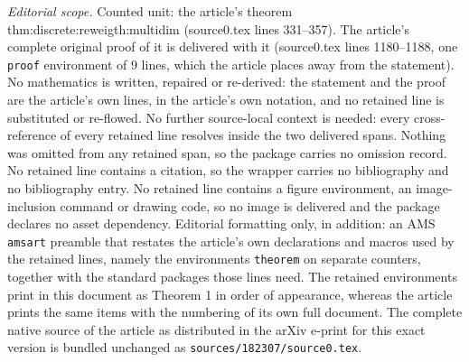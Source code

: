 \documentclass[10pt,a4paper]{amsart}
\begin{document}
\noindent\textit{Editorial scope.} Counted unit: the article's theorem thm:discrete:reweigth:multidim (source0.tex lines 331--357). The article's complete original proof of it is delivered with it (source0.tex lines 1180--1188, one \texttt{proof} environment of 9 lines, which the article places away from the statement). No mathematics is written, repaired or re-derived: the statement and the proof are the article's own lines, in the article's own notation, and no retained line is substituted or re-flowed.  No further source-local context is needed: every cross-reference of every retained line resolves inside the two delivered spans.  Nothing was omitted from any retained span, so the package carries no omission record.  No retained line contains a citation, so the wrapper carries no bibliography and no bibliography entry.  No retained line contains a figure environment, an image-inclusion command or drawing code, so no image is delivered and the package declares no asset dependency.  Editorial formatting only, in addition: an AMS \texttt{amsart} preamble that restates the article's own declarations and macros used by the retained lines, namely the environments \texttt{theorem} on separate counters, together with the standard packages those lines need.  The retained environments print in this document as Theorem 1 in order of appearance, whereas the article prints the same items with the numbering of its own full document.  The complete native source of the article as distributed in the arXiv e-print for this exact version is bundled unchanged as \texttt{sources/182307/source0.tex}.
\end{document}
